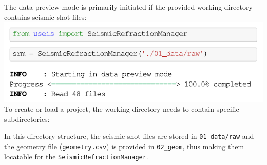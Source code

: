 \documentclass[a4paper,fleqn]{cas-sc}
\begin{document}
The data preview mode is primarily initiated if the provided working directory contains seismic shot files:
\newline
\includegraphics[width=.5\textwidth]{./figures/data_preview_mode.pdf}
\newline
To create or load a project, the working directory needs to contain specific subdirectories:

In this directory structure, the seismic shot files are stored in \texttt{01\_data/raw} and the geometry file (\texttt{geometry.csv}) is provided in \texttt{02\_geom}, thus making them locatable for the \texttt{SeismicRefractionManager}.
\end{document}
